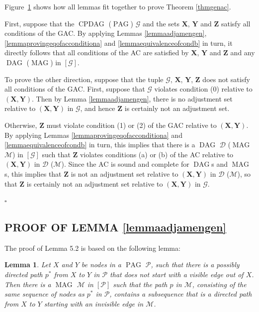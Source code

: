 \documentclass[]{article}
\DeclareMathOperator{\CPDAG}{CPDAG}
\DeclareMathOperator{\DAG}{DAG}
\DeclareMathOperator{\MAG}{MAG}
\DeclareMathOperator{\PAG}{PAG}
\newtheorem{lemma}[theorem]{Lemma}
\theoremstyle{definition}
\newenvironment{proofthm}{\noindent{\bf Proof of Theorem \ref{thmgenac}:}}%
{\hfill $\square$}
\theoremstyle{remark}
\newcommand{\g}[1][G]{\mathcal{#1}}
\newcommand{\pstar}[1][p]{{#1}^{*}}
\begin{document}
\begin{figure}[omitted: a diagram of this paper's results, not reproduced here]\label{figproof}\end{figure}

Figure~\ref{figproof} shows how all lemmas fit together to prove Theorem \ref{thmgenac}.

\begin{proofthm}
   First, suppose that the $\CPDAG$ ($\PAG$) $\g$ and the sets $\mathbf{X}$, $\mathbf{Y}$ and $\mathbf{Z}$ satisfy all conditions of the GAC. By applying Lemmas \ref{lemmaadjamengen}, \ref{lemmaprovingeqofacconditiona} and \ref{lemmaequivalenceofcondb} in turn, it directly follows that all conditions of the AC are satisfied by $\mathbf{X}$, $\mathbf{Y}$ and $\mathbf{Z}$ and any $\DAG$ ($\MAG$) in $[\g]$.

   To prove the other direction, suppose that the tuple $\g$, $\mathbf{X}$, $\mathbf{Y}$, $\mathbf{Z}$ does not satisfy all conditions of the GAC. First, suppose that $\g$ violates condition (0) relative to $(\mathbf{X},\mathbf{Y})$. Then by Lemma \ref{lemmaadjamengen}, there is no adjustment set relative to $(\mathbf{X},\mathbf{Y})$ in $\g$, and hence $\mathbf{Z}$ is certainly not an adjustment set.

   Otherwise, $\mathbf{Z}$ must violate condition (1) or (2) of the GAC relative to $(\mathbf{X},\mathbf{Y})$. By applying Lemmas \ref{lemmaprovingeqofacconditiona} and \ref{lemmaequivalenceofcondb} in turn, this implies that there is a $\DAG$ $\g[D]$ ($\MAG$ $\g[M]$) in $[\g]$ such that $\mathbf{Z}$ violates conditions (a) or (b) of the AC relative to $(\mathbf{X},\mathbf{Y})$ in $\g[D]$ ($\g[M]$).
   Since the AC is sound and complete for $\DAG$s and $\MAG$s, this implies that $\mathbf{Z}$ is not an adjustment set relative to $(\mathbf{X},\mathbf{Y})$ in $\g[D]$ ($\g[M]$), so that $\mathbf{Z}$ is certainly not an adjustment set relative to $(\mathbf{X},\mathbf{Y})$ in $\g$.

\end{proofthm}

\subsection{PROOF OF LEMMA \ref{lemmaadjamengen}}\label{sec: adjustment amenable proof}

The proof of Lemma 5.2 is based on the following lemma:

\begin{lemma}
 Let $X$ and $Y$ be nodes in a $\PAG$ $\g[P]$, such that there is a possibly directed path $\pstar$ from $X$ to $Y$ in $\g[P]$ that does not start with a visible edge out of $X$. Then there is a $\MAG$ $\g[M]$ in $[\g[P]]$ such that the path $p$ in $\g[M]$, consisting of the same sequence of nodes as $\pstar$ in $\g[P]$, contains a subsequence that is a directed path from $X$ to $Y$ starting with an invisible edge in $\g[M]$.
    \label{lemmadirectedpath}
\end{lemma}
\end{document}
